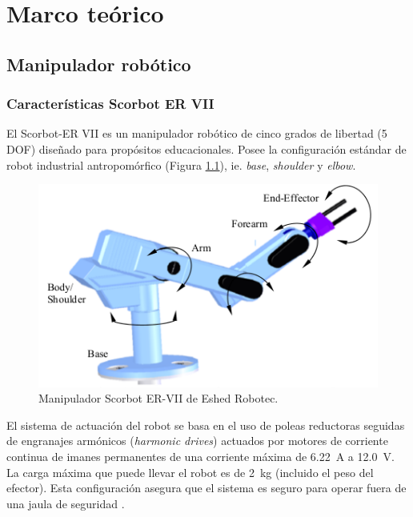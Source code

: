 \chapter{Marco teórico}

\section{Manipulador robótico}

\subsection{Características Scorbot ER VII}

El Scorbot-ER VII es un  manipulador robótico de cinco grados de libertad (5 DOF) diseñado para propósitos educacionales. Posee la configuración estándar de robot industrial antropomórfico (Figura \ref{cap2_scorbot}), ie. \textit{base}, \textit{shoulder} y \textit{elbow}.

\begin{figure}[ht]
  \centering
  \includegraphics[scale=0.5]{img/cap2/scorbot}
  \caption{Manipulador Scorbot ER-VII de Eshed Robotec.}
  \label{cap2_scorbot}
\end{figure}

El sistema de actuación del robot se basa en el uso de poleas reductoras seguidas de engranajes armónicos (\textit{harmonic drives}) actuados por motores de corriente continua de imanes permanentes de una corriente máxima de \SI{6,22}{\ampere} a \SI{12,0}{\volt}. La carga máxima que puede llevar el robot es de \SI{2}{\kilo\gram} (incluido el peso del efector). Esta configuración asegura que el sistema es seguro para operar fuera de una jaula de seguridad \cite{scorbot1998}.



